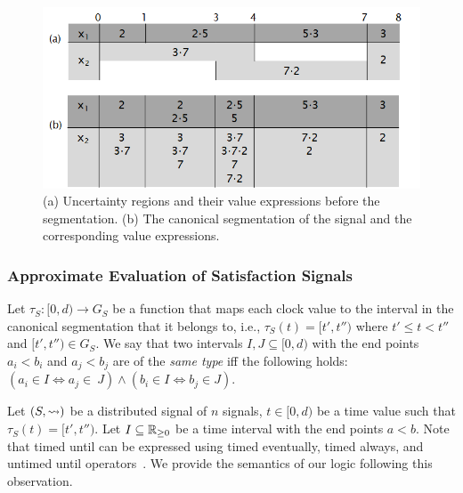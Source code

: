 \begin{figure} 
	\centering
	\includegraphics[scale=0.4]{valexpr.png}
	\caption{(a) Uncertainty regions and their value expressions before the segmentation. (b) The canonical segmentation of the signal and the corresponding value expressions.\label{fig:valexpr}}
\end{figure}

\subsubsection{Approximate Evaluation of Satisfaction Signals}

Let $\tau_S : [0,d) \to G_S$ be a function that maps each clock value to the interval in the canonical segmentation that it belongs to, i.e., $\tau_S(t) = [t',t'')$ where $t' \leq t < t''$ and $[t',t'') \in G_S$.
We say that two intervals $I, J \subseteq [0,d)$ with the end points $a_i < b_i$ and $a_j < b_j$ are of the \emph{same type} iff the following holds: $(a_i \in I \iff a_j \in~J) \land (b_i \in I \iff b_j \in J)$.

Let $(S, {\rightsquigarrow})$ be a distributed signal of $n$ signals, $t \in [0,d)$ be a time value such that $\tau_S(t) = [t', t'')$.
Let $I \subseteq \mathbb{R}_{\geq 0}$ be a time interval with the end points $a < b$.
Note that timed until can be expressed using timed eventually, timed always, and untimed until operators~\cite{MalerN13}.
We provide the semantics of our logic following this observation.

